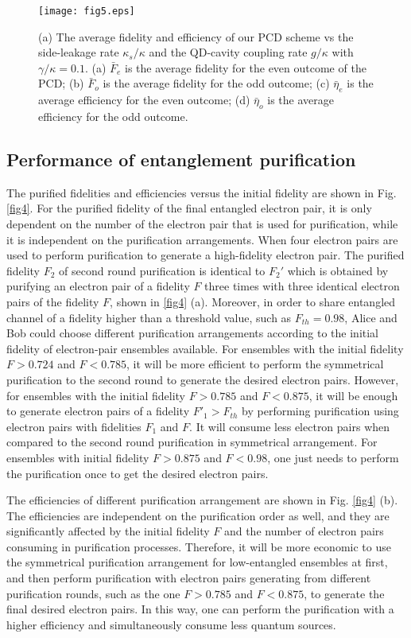 \documentclass[aps,graphicx,twocolumn]{revtex4}%
\begin{document}
 \begin{figure*}[!tpb]
  \centering
  \texttt{[image: fig5.eps]}
  \caption{(a) The average fidelity and efficiency of our PCD scheme vs the side-leakage rate $\kappa_s/\kappa$ and the QD-cavity coupling rate $g/\kappa$ with $\gamma/\kappa=0.1$. (a) $\bar{F}_e$ is the average fidelity for the even outcome of the PCD; (b) $\bar{F}_o$ is the average fidelity for the odd outcome; (c) $\bar{\eta}_e$ is the average efficiency for the even outcome; (d) $\bar{\eta}_o$ is the average efficiency for the odd outcome.}\label{fig5}
\end{figure*}



\subsection{Performance of entanglement purification}
The purified fidelities and efficiencies versus the initial fidelity are shown in Fig. \ref{fig4}. For the purified fidelity of the final entangled electron pair, it is only dependent on the number of the electron pair that is used for purification, while it is independent on the purification arrangements. When four electron pairs are used to perform purification to generate a high-fidelity electron pair.  The purified fidelity $F_2$ of second round purification is identical to $F_2'$ which is obtained by purifying an electron pair of a fidelity $F$ three times with three identical electron pairs of the fidelity $F$, shown in \ref{fig4} (a). Moreover, in order to share entangled channel of a fidelity higher than a threshold value, such as $F_{th}=0.98$, Alice and Bob could choose different purification arrangements according to the initial fidelity of electron-pair ensembles available. For ensembles with the initial fidelity $F>0.724$ and $F<0.785$, it will be more efficient to perform the symmetrical purification to the second round to generate the desired electron pairs. However, for ensembles with the initial fidelity $F>0.785$ and $F<0.875$, it will be enough to generate electron pairs of a fidelity $F'_1>F_{th}$ by performing purification using electron pairs with fidelities $F_1$ and $F$. It will consume less electron pairs when compared to the second round purification in symmetrical arrangement. For ensembles with initial fidelity $F>0.875$ and $F<0.98$, one just needs to perform the purification once to get the desired electron pairs.

The efficiencies of different purification arrangement are shown in Fig. \ref{fig4} (b).
The efficiencies are independent on the purification order as well,
and they are significantly affected by the initial fidelity $F$ and
the number of electron pairs consuming in purification processes.
Therefore, it will be more economic to use the symmetrical purification arrangement for low-entangled ensembles at first, and then
perform purification with electron pairs generating from different purification rounds, such as the one $F>0.785$ and $F<0.875$, to generate the final desired electron pairs. In this way, one can perform the purification with a higher efficiency and simultaneously consume less quantum sources.
\end{document}
